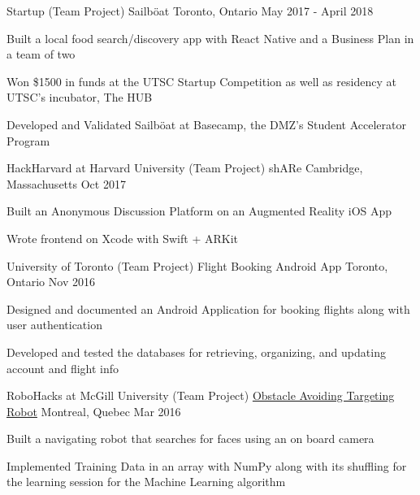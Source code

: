 \begin{cventries}
\cventry
    {Startup (Team Project)}
    {Sailböat}
    {Toronto, Ontario}
    {May 2017 - April 2018}
    {
      \begin{cvitems}
        \item {Built a local food search/discovery app with React Native and a Business Plan in a team of two}
        \item {Won \$1500 in funds at the UTSC Startup Competition as well as residency at UTSC's incubator, The HUB}
        \item {Developed and Validated Sailböat at Basecamp, the DMZ's Student Accelerator Program}
      \end{cvitems}
    }
\cventry
    {HackHarvard at Harvard University (Team Project)}
    {shARe}
    {Cambridge, Massachusetts}
    {Oct 2017}
    {
      \begin{cvitems}
        \item {Built an Anonymous Discussion Platform on an Augmented Reality iOS App}
        \item {Wrote frontend on Xcode with Swift + ARKit}
      \end{cvitems}
    }
\cventry
    {University of Toronto (Team Project)}
    {Flight Booking Android App}
    {Toronto, Ontario}
    {Nov 2016}
    {
      \begin{cvitems}
        \item {Designed and documented an Android Application for booking flights along with user authentication}
        \item {Developed and tested the databases for retrieving, organizing, and updating account and flight info}
      \end{cvitems}
    }
\cventry
    {RoboHacks at McGill University (Team Project)}
    {\href{https://github.com/PhABC/HeadHunterBots}{Obstacle Avoiding Targeting Robot}}
    {Montreal, Quebec}
    {Mar 2016}
    {
      \begin{cvitems}
        \item {Built a navigating robot that searches for faces using an on board camera}
        \item {Implemented Training Data in an array with NumPy along with its shuffling for the learning session for the Machine Learning algorithm}
      \end{cvitems}
    }
\end{cventries}
